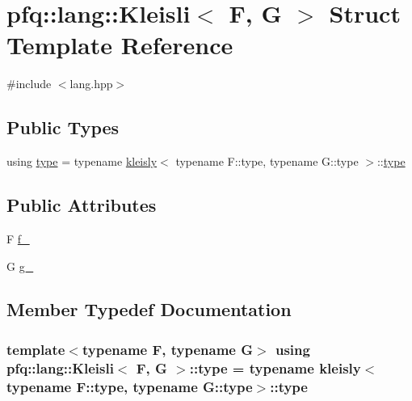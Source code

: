 \hypertarget{structpfq_1_1lang_1_1Kleisli}{}\section{pfq\+:\+:lang\+:\+:Kleisli$<$ F, G $>$ Struct Template Reference}
\label{structpfq_1_1lang_1_1Kleisli}


{\ttfamily \#include $<$lang.\+hpp$>$}

\subsection*{Public Types}
\begin{DoxyCompactItemize}
\item 
using \hyperlink{structpfq_1_1lang_1_1Kleisli_af25d7b2324d773054a01edc8ea5dab85}{type} = typename \hyperlink{structpfq_1_1lang_1_1kleisly}{kleisly}$<$ typename F\+::type, typename G\+::type $>$\+::\hyperlink{structpfq_1_1lang_1_1Kleisli_af25d7b2324d773054a01edc8ea5dab85}{type}
\end{DoxyCompactItemize}
\subsection*{Public Attributes}
\begin{DoxyCompactItemize}
\item 
F \hyperlink{structpfq_1_1lang_1_1Kleisli_a904b72f295e1a832136714faca8a5119}{f\+\_\+}
\item 
G \hyperlink{structpfq_1_1lang_1_1Kleisli_a29fe52c910805bb5d9582e1ee9a8b2ab}{g\+\_\+}
\end{DoxyCompactItemize}


\subsection{Member Typedef Documentation}
\subsubsection[{\texorpdfstring{type}{type}}]{\setlength{\rightskip}{0pt plus 5cm}template$<$typename F, typename G$>$ using {\bf pfq\+::lang\+::\+Kleisli}$<$ F, G $>$\+::{\bf type} =  typename {\bf kleisly}$<$typename F\+::type, typename G\+::type$>$\+::{\bf type}}\hypertarget{structpfq_1_1lang_1_1Kleisli_af25d7b2324d773054a01edc8ea5dab85}{}\label{structpfq_1_1lang_1_1Kleisli_af25d7b2324d773054a01edc8ea5dab85}


